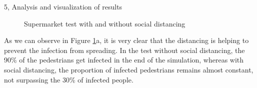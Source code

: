 \begin{task}{5, Analysis and visualization of results}
\begin{figure}[H]
\centering
{}
\caption{Supermarket test with and without social distancing}
\label{socialvsnosocial}
\end{figure}

As we can observe in Figure \ref{socialvsnosocial}a, it is very clear that the distancing is helping to prevent the infection from spreading. In the test without social distancing, the 90\% of the pedestrians get infected in the end of the simulation, whereas with social distancing, the proportion of infected pedestrians remains almost constant, not surpassing the 30\% of infected people.


\end{task}
